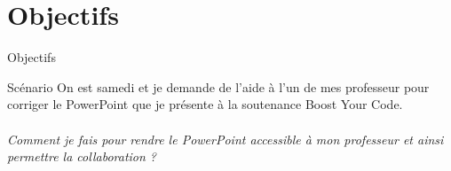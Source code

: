 \section{Objectifs}

\begin{frame}{Objectifs}
  \begin{block}{Scénario}
  On est samedi et je demande de l'aide à l'un de mes professeur pour corriger 
  le PowerPoint que je présente à la soutenance Boost Your Code.\\
  ~\\
  \emph{Comment je fais pour rendre le PowerPoint accessible à mon professeur et
  ainsi permettre la collaboration ?}
  \end{block}
\end{frame}

